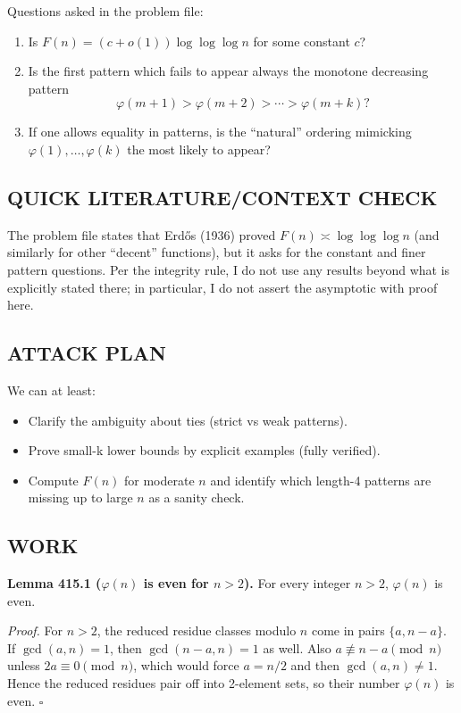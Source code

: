 Questions asked in the problem file:
\begin{enumerate}
  \item Is $F(n)=(c+o(1))\log\log\log n$ for some constant $c$?
  \item Is the first pattern which fails to appear always the monotone decreasing pattern
  $$\varphi(m+1)>\varphi(m+2)>\cdots>\varphi(m+k)?$$
  \item If one allows equality in patterns, is the ``natural'' ordering mimicking $\varphi(1),\dots,\varphi(k)$ the most likely to appear?
\end{enumerate}

\subsection*{QUICK LITERATURE/CONTEXT CHECK}
The problem file states that Erd\H{o}s (1936) proved $F(n)\asymp\log\log\log n$ (and similarly for other ``decent'' functions), but it asks for the constant and finer pattern questions.
Per the integrity rule, I do not use any results beyond what is explicitly stated there; in particular, I do not assert the asymptotic with proof here.

\subsection*{ATTACK PLAN}
We can at least:
\begin{itemize}
  \item Clarify the ambiguity about ties (strict vs weak patterns).
  \item Prove small-k lower bounds by explicit examples (fully verified).
  \item Compute $F(n)$ for moderate $n$ and identify which length-4 patterns are missing up to large $n$ as a sanity check.
\end{itemize}

\subsection*{WORK}
\textbf{Lemma 415.1 ($\varphi(n)$ is even for $n>2$).}
For every integer $n>2$, $\varphi(n)$ is even.

\textit{Proof.}
For $n>2$, the reduced residue classes modulo $n$ come in pairs $\{a,n-a\}$.
If $\gcd(a,n)=1$, then $\gcd(n-a,n)=1$ as well.
Also $a\not\equiv n-a\pmod n$ unless $2a\equiv0\pmod n$, which would force $a=n/2$ and then $\gcd(a,n)\ne1$.
Hence the reduced residues pair off into 2-element sets, so their number $\varphi(n)$ is even.
\hfill$\square$

